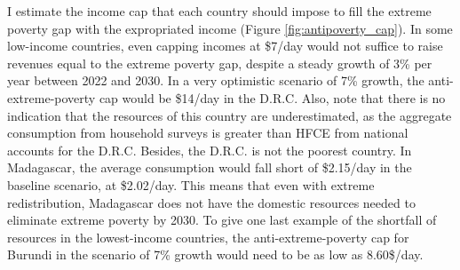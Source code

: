 I estimate the income cap that each country should impose to fill the extreme poverty gap with the expropriated income (Figure \ref{fig:antipoverty_cap}). 
In some low-income countries, even capping incomes at \$7/day would not suffice to raise revenues equal to the extreme poverty gap, despite a steady growth of 3\% per year between 2022 and 2030. 
In a very optimistic scenario of 7\% growth, the anti-extreme-poverty cap would be \$14/day in the D.R.C. Also, note that there is no indication that the resources of this country are underestimated, as the aggregate consumption from household surveys is greater than HFCE %
from national accounts for the D.R.C. 
Besides, the D.R.C. is not the poorest country. 
In Madagascar, the average consumption would fall short of \$2.15/day in the baseline scenario, at \$2.02/day. This means that even with extreme redistribution, Madagascar does not have the domestic resources needed to eliminate extreme poverty by 2030. 
To give one last example of the shortfall of resources in the lowest-income countries, the anti-extreme-poverty cap for Burundi in the scenario of 7\% growth would need to be as low as 8.60\$/day. 

